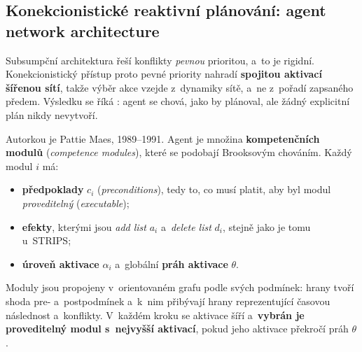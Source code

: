 \documentclass[11pt,a4paper]{article}
\theoremstyle{definition}
\begin{document}
\subsection{Konekcionistické reaktivní plánování: agent network architecture}
\label{ssec:maes}

Subsumpční architektura řeší konflikty \emph{pevnou} prioritou, a~to je rigidní. Konekcionistický
přístup proto pevné priority nahradí \textbf{spojitou aktivací šířenou sítí}, takže výběr akce
vzejde z~dynamiky sítě, a~ne z~pořadí zapsaného předem. Výsledku se říká : agent se chová, jako by plánoval, ale žádný explicitní plán nikdy nevytvoří.

\begin{defbox}
Autorkou je Pattie Maes, 1989--1991. Agent je množina \textbf{kompetenčních modulů}
(\emph{competence modules}), které se podobají Brooksovým chováním. Každý modul $i$ má:
\begin{itemize}
\item \textbf{předpoklady} $c_i$ (\emph{preconditions}), tedy to, co musí platit, aby byl modul
  \emph{proveditelný} (\emph{executable});
\item \textbf{efekty}, kterými jsou \emph{add list} $a_i$ a~\emph{delete list} $d_i$, stejně
  jako je tomu u~STRIPS;
\item \textbf{úroveň aktivace} $\alpha_i$ a~globální \textbf{práh aktivace} $\theta$.
\end{itemize}
Moduly jsou propojeny v~orientovaném grafu podle svých podmínek: hrany tvoří shoda pre-
a~postpodmínek a~k~nim přibývají hrany reprezentující časovou následnost a~konflikty.
V~každém kroku se aktivace šíří a~\textbf{vybrán je proveditelný modul s~nejvyšší aktivací},
pokud jeho aktivace překročí práh $\theta$.
\end{defbox}
\end{document}
